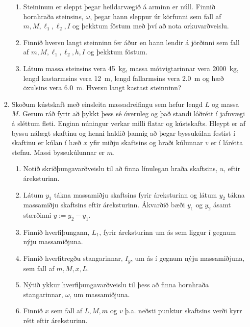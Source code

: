 \begin{enumerate}[label = \textbf{Dæmi \thechapter.\arabic*.}]
\begin{enumerate}[label=\textbf{(\alph*)}]
    \item Steininum er sleppt þegar heildarvægið á arminn er núll. Finnið hornhraða steinsins, \(\omega\), þegar hann sleppur úr körfunni sem fall af $m, M, \ell_1, \ell_2, I$ og þekktum föstum með því að nota orkuvarðveislu.

    
    \item Finnið hversu langt steinninn fer áður en hann lendir á jörðinni sem fall af $m, M, \ell_1, \ell_2, h, I$ og þekktum föstum.
    
    \item Látum massa steinsins vera \SI{45}{kg}, massa mótvigtarinnar vera \SI{2000}{kg}, lengd kastarmsins vera \SI{12}{m}, lengd fallarmsins vera \SI{2.0}{m} og hæð öxulsins vera \SI{6.0}{m}. Hversu langt kastast steinninn?
\end{enumerate}

\item Skoðum kústskaft með einsleita massadreifingu sem hefur lengd $L$ og massa $M$. Gerum ráð fyrir að þykkt þess sé óveruleg og það standi lóðrétt í jafnvægi á sléttum fleti. Enginn núningur verkar milli flatar og kústskafts. Hleypt er af byssu nálægt skaftinu og henni haldið þannig að þegar byssukúlan festist í skaftinu er kúlan í hæð $x$ yfir miðju skaftsins og hraði kúlunnar $v$ er í lárétta stefnu. Massi byssukúlunnar er $m$. 

\begin{enumerate}[label = \textbf{(\alph*)}]
    \item Notið skriðþungavarðveislu til að finna línulegan hraða skaftsins, $u$, eftir áreksturinn.
    
    \item Látum $y_1$ tákna massamiðju skaftsins fyrir áreksturinn og látum $y_2$ tákna massamiðju skaftsins eftir áreksturinn. Ákvarðið bæði $y_1$ og $y_2$ ásamt stærðinni $y := y_2-y_1$.
    
    \item Finnið hverfiþungann, $L_{1}$, fyrir áreksturinn um ás sem liggur í gegnum nýju massamiðjuna.
    
    \item Finnið hverfitregðu stangarinnar, $I_y$, um ás í gegnum nýju massamiðjuna, sem fall af $m, M, x, L$.
    
    \item Nýtið ykkur hverfiþungavarðveislu til þess að finna hornhraða stangarinnar, $\omega$, um massamiðjuna.
    
    \item Finnið $x$ sem fall af $L, M, m$ og $v$ þ.a. neðsti punktur skaftsins verði kyrr rétt eftir áreksturinn.
\end{enumerate}

\end{enumerate}



